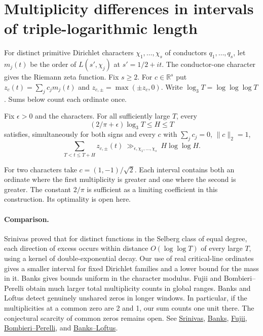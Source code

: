 \section{Multiplicity differences in intervals of triple-logarithmic length}
\label{sec:short}
For distinct primitive Dirichlet characters $\chi_1,\ldots,\chi_s$ of conductors
$q_1,\ldots,q_s$, let $m_j(t)$ be the order of $L(s',\chi_j)$ at $s'=1/2+it$.
The conductor-one character gives the Riemann zeta function. Fix $s\ge2$.
For $c\in\mathbb R^s$ put $z_c(t)=\sum_jc_jm_j(t)$ and
$z_{c,\pm}=\max(\pm z_c,0)$. Write $\log_3 T=\log\log\log T$.
Sums below count each ordinate once.

\begin{theorem}\label{th:short}
Fix $\epsilon>0$ and the characters. For all sufficiently large $T$, every
\[
 (2/\pi+\epsilon)\log_3 T\le H\le T
\]
satisfies, simultaneously for both signs and every $c$ with
$\sum_jc_j=0$, $\|c\|_2=1$,
\[
 \sum_{T<t\le T+H}z_{c,\pm}(t)\ \gg_{\epsilon,\chi_1,\ldots,\chi_s}\ H\log\log H .
\]
\end{theorem}
For two characters take $c=(1,-1)/\sqrt2$. Each interval contains both an
ordinate where the first multiplicity is greater and one where the second is
greater. The constant $2/\pi$ is sufficient as a limiting coefficient in
this construction. Its optimality is open here.

\paragraph{Comparison.}
Srinivas proved that for distinct functions in the Selberg class of
equal degree, each direction of excess occurs within distance
$O(\log\log T)$ of every large $T$, using a kernel of double-exponential
decay. Our use of real critical-line ordinates gives a smaller interval for
fixed Dirichlet families and a lower bound for the mass in it.
Banks gives bounds uniform in the character modulus.
Fujii and Bombieri--Perelli obtain much larger total multiplicity counts in
global ranges. Banks and Loftus detect genuinely unshared zeros in longer
windows. In particular, if the multiplicities at a common zero are 2 and
1, our sum counts one unit there. The conjectural scarcity of common zeros
remains open. See \href{https://doi.org/10.4064/aa103-3-1}{Srinivas},
\href{https://arxiv.org/abs/2302.07073}{Banks},
\href{https://matwbn.icm.edu.pl/ksiazki/aa/aa28/aa2847.pdf}{Fujii},
\href{https://doi.org/10.4064/aa-83-3-271-281}{Bombieri--Perelli}, and
\href{https://arxiv.org/abs/2607.22930}{Banks--Loftus}.

